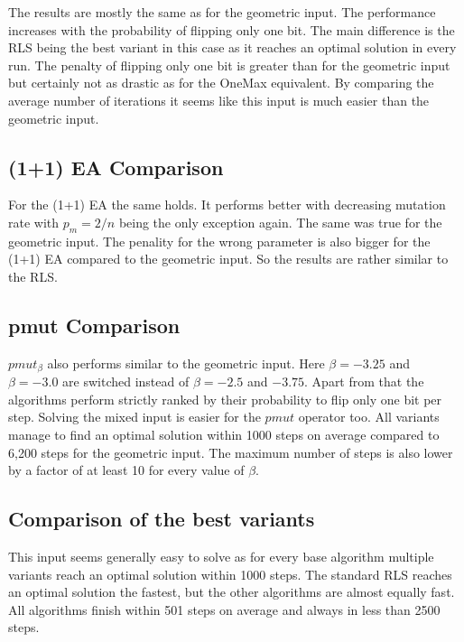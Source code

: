 

The results are mostly the same as for the geometric input.
The performance increases with the probability of flipping only one bit.
The main difference is the RLS being the best variant in this case as it reaches an optimal solution in every run.
The penalty of flipping only one bit is greater than for the geometric input but certainly not as drastic as for the OneMax equivalent.
By comparing the average number of iterations it seems like this input is much easier than the geometric input.
\subsection{(1+1) EA Comparison}




For the (1+1) EA the same holds.
It performs better with decreasing mutation rate with $p_m=2/n$ being the only exception again.
The same was true for the geometric input.
The penality for the wrong parameter is also bigger for the (1+1) EA compared to the geometric input.
So the results are rather similar to the RLS.
\subsection{pmut Comparison}




$pmut_\beta$ also performs similar to the geometric input.
Here $\beta=-3.25$ and $\beta=-3.0$ are switched instead of $\beta = -2.5$ and $-3.75$.
Apart from that the algorithms perform strictly ranked by their probability to flip only one bit per step.
Solving the mixed input is easier for the $pmut$ operator too.
All variants manage to find an optimal solution within 1000 steps on average compared to 6,200 steps for the geometric input.
The maximum number of steps is also lower by a factor of at least 10 for every value of $\beta$.
\subsection{Comparison of the best variants}




This input seems generally easy to solve as for every base algorithm multiple variants reach an optimal solution within 1000 steps.
The standard RLS reaches an optimal solution the fastest, but the other algorithms are almost equally fast.
All algorithms finish within 501 steps on average and always in less than 2500 steps.

